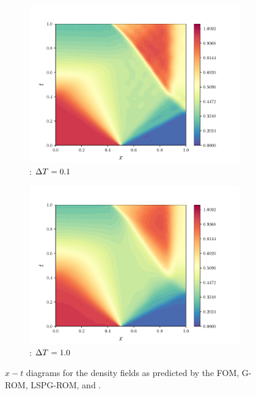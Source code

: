 \begin{figure}
\begin{center}
\begin{subfigure}[t]{0.48\textwidth}
\includegraphics[width=1.\linewidth]{figs/sod/xt_w50.pdf}
\caption{\methodAcronym: $\Delta T^{} = 0.1$}
\end{subfigure}
\begin{subfigure}[t]{0.48\textwidth}
\includegraphics[width=1.\linewidth]{figs/sod/xt_w500.pdf}
\caption{\methodAcronym: $\Delta T^{} = 1.0$}
\end{subfigure}
\caption{$x-t$ diagrams for the density fields as predicted by the FOM, G-ROM,
	LSPG-ROM, and \methodAcronymROMs. }
\label{fig:sod_xt}
\end{center}
\end{figure}

